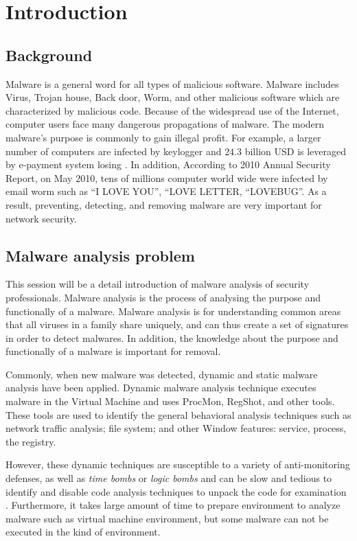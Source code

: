 \chapter{Introduction}\label{chap:1}

%
%
\section{Background}
Malware is a general word for all types of malicious software. Malware includes Virus, Trojan house, Back door, Worm, and other malicious software which are characterized by malicious code.
Because of the widespread use of the Internet, computer users face many dangerous propagations of malware. The modern malware's purpose is commonly to gain illegal profit. For example, a larger number of computers are infected by keylogger and $24.3$ billion USD is leveraged  by e-payment system losing \cite{keylogger}. In addition, According to 2010 Annual Security Report, on May 2010, tens of millions computer world wide were infected by email worm such as “I LOVE YOU”, “LOVE LETTER, “LOVEBUG”\cite{Symantec}. As a result, preventing, detecting, and removing malware are very important for network security.
	
\section{Malware analysis problem}	
This session will be a detail introduction of malware analysis of security professionals. Malware analysis is the process of analysing the purpose and functionally of a malware. Malware analysis is for understanding common areas that all viruses in a family share uniquely, and can thus create a set of signatures in order to detect malwares. In addition, the knowledge about the purpose and functionally of a malware is important for removal.

Commonly, when new malware was detected, dynamic and static malware analysis have been applied. Dynamic malware analysis technique executes malware in the Virtual Machine and uses ProcMon, RegShot, and other tools. These tools are used to identify the general behavioral analysis techniques such as network traffic analysis; file system; and other Window features: service, process, the registry. 

However, these dynamic techniques are susceptible to a variety of anti-monitoring defenses, as well as \emph{time bombs} or \emph{logic bombs} and can be slow and tedious to identify and disable code analysis techniques to unpack the code for examination \cite{georg}. Furthermore, it takes large amount of time to prepare environment to analyze malware such as virtual machine environment, but some malware can not be executed in the kind of environment.

